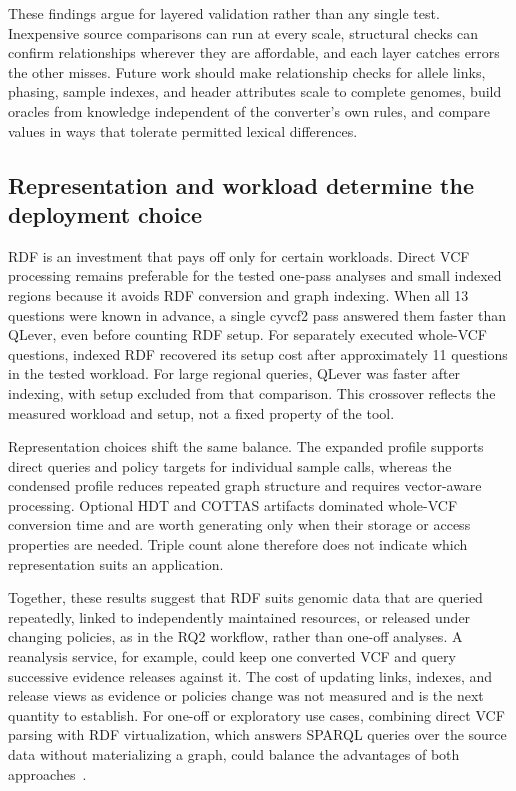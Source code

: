 \documentclass[pdflatex,sn-mathphys-num,referee]{sn-jnl}
\begin{document}
These findings argue for layered validation rather than any single test.
Inexpensive source comparisons can run at every scale, structural checks can confirm relationships wherever they are affordable, and each layer catches errors the other misses.
Future work should make relationship checks for allele links, phasing, sample indexes, and header attributes scale to complete genomes, build oracles from knowledge independent of the converter's own rules, and compare values in ways that tolerate permitted lexical differences.


\subsection{Representation and workload determine the deployment choice}\label{subsec:disc-deployment}
RDF is an investment that pays off only for certain workloads.
Direct VCF processing remains preferable for the tested one-pass analyses and small indexed regions because it avoids RDF conversion and graph indexing.
When all 13 questions were known in advance, a single cyvcf2 pass answered them faster than QLever, even before counting RDF setup.
For separately executed whole-VCF questions, indexed RDF recovered its setup cost after approximately 11 questions in the tested workload.
For large regional queries, QLever was faster after indexing, with setup excluded from that comparison.
This crossover reflects the measured workload and setup, not a fixed property of the tool.

Representation choices shift the same balance.
The expanded profile supports direct queries and policy targets for individual sample calls, whereas the condensed profile reduces repeated graph structure and requires vector-aware processing.
Optional HDT and COTTAS artifacts dominated whole-VCF conversion time and are worth generating only when their storage or access properties are needed.
Triple count alone therefore does not indicate which representation suits an application.

Together, these results suggest that RDF suits genomic data that are queried repeatedly, linked to independently maintained resources, or released under changing policies, as in the RQ2 workflow, rather than one-off analyses.
A reanalysis service, for example, could keep one converted VCF and query successive evidence releases against it.
The cost of updating links, indexes, and release views as evidence or policies change was not measured and is the next quantity to establish.
For one-off or exploratory use cases, combining direct VCF parsing with RDF virtualization, which answers SPARQL queries over the source data without materializing a graph, could balance the advantages of both approaches~\cite{xiao2019vkg}.
\end{document}
